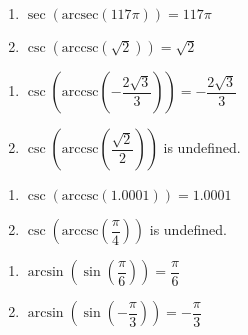 \begin{multicols}{2}

\begin{enumerate}

\setcounter{enumi}{\value{HW}}

\item $\sec\left(\text{arcsec}\left( 117\pi \right)\right)= 117\pi $
\item $\csc\left(\text{arccsc}\left(\sqrt{2}\right)\right) = \sqrt{2}$ 

\setcounter{HW}{\value{enumi}}

\end{enumerate}

\end{multicols}

\begin{multicols}{2}

\begin{enumerate}

\setcounter{enumi}{\value{HW}}

\item $\csc\left(\text{arccsc}\left(-\dfrac{2\sqrt{3}}{3}\right)\right) = -\dfrac{2\sqrt{3}}{3}$
\item $\csc\left(\text{arccsc}\left(\dfrac{\sqrt{2}}{2}\right)\right)$ is undefined.

\setcounter{HW}{\value{enumi}}

\end{enumerate}

\end{multicols}

\begin{multicols}{2}

\begin{enumerate}

\setcounter{enumi}{\value{HW}}

\item $\csc\left(\text{arccsc}\left(1.0001\right)\right) = 1.0001$ 
\item $\csc\left(\text{arccsc}\left( \dfrac{\pi}{4} \right)\right)$ is undefined.

\setcounter{HW}{\value{enumi}}

\end{enumerate}

\end{multicols}

\begin{multicols}{2}

\begin{enumerate}

\setcounter{enumi}{\value{HW}}

\item  $\arcsin\left(\sin\left(\dfrac{\pi}{6}\right) \right) = \dfrac{\pi}{6}$
\item  $\arcsin\left(\sin\left(-\dfrac{\pi}{3}\right) \right) = -\dfrac{\pi}{3}$

\setcounter{HW}{\value{enumi}}

\end{enumerate}

\end{multicols}

